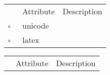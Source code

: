 \begin{table}
\caption{Translator  }

\begin{longtable}{llp{8cm}}
& Attribute & Description \\
$\square$\ & unicode &  \\
$\square$\ & latex &  \\
\end{longtable}
\label{attr:Translator}
\end{table}

\begin{table}
\caption{UncategorizedReference  }

\begin{longtable}{llp{8cm}}
& Attribute & Description \\
\end{longtable}
\label{attr:UncategorizedReference}
\end{table}

